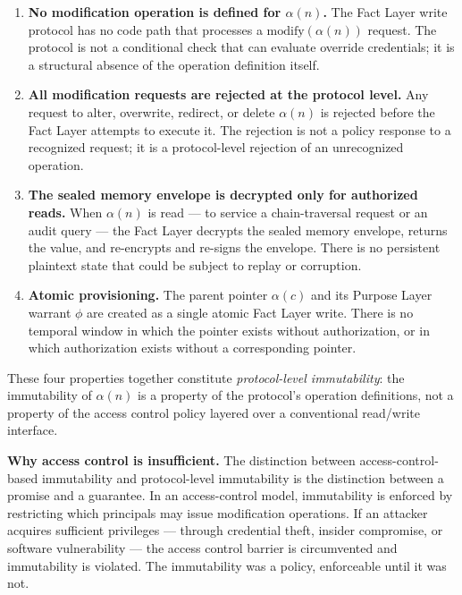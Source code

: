 \begin{enumerate}
    \item[(W1)] \textbf{No modification operation is defined for $\alpha(n)$.} The Fact Layer write protocol has no code path that processes a $\mathrm{modify}(\alpha(n))$ request. The protocol is not a conditional check that can evaluate override credentials; it is a structural absence of the operation definition itself.

    \item[(W2)] \textbf{All modification requests are rejected at the protocol level.} Any request to alter, overwrite, redirect, or delete $\alpha(n)$ is rejected before the Fact Layer attempts to execute it. The rejection is not a policy response to a recognized request; it is a protocol-level rejection of an unrecognized operation.

    \item[(W3)] \textbf{The sealed memory envelope is decrypted only for authorized reads.} When $\alpha(n)$ is read --- to service a chain-traversal request or an audit query --- the Fact Layer decrypts the sealed memory envelope, returns the value, and re-encrypts and re-signs the envelope. There is no persistent plaintext state that could be subject to replay or corruption.

    \item[(W4)] \textbf{Atomic provisioning.} The parent pointer $\alpha(c)$ and its Purpose Layer warrant $\phi$ are created as a single atomic Fact Layer write. There is no temporal window in which the pointer exists without authorization, or in which authorization exists without a corresponding pointer.
\end{enumerate}

These four properties together constitute \emph{protocol-level immutability}: the immutability of $\alpha(n)$ is a property of the protocol's operation definitions, not a property of the access control policy layered over a conventional read/write interface.

\medskip
\noindent\textbf{Why access control is insufficient.} The distinction between access-control-based immutability and protocol-level immutability is the distinction between a promise and a guarantee. In an access-control model, immutability is enforced by restricting which principals may issue modification operations. If an attacker acquires sufficient privileges --- through credential theft, insider compromise, or software vulnerability --- the access control barrier is circumvented and immutability is violated. The immutability was a policy, enforceable until it was not.


